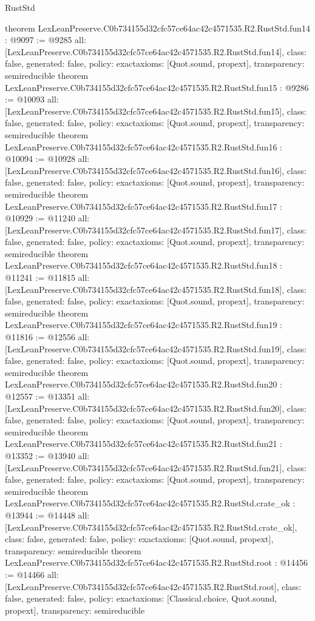 \begin{lexlean}{RustStd}
\begin{coremodule}
{}
theorem LexLeanPreserve.C0b734155d32cfc57ce64ac42c4571535.R2.RustStd.fun14 : @9097 := @9285 {
  all: [LexLeanPreserve.C0b734155d32cfc57ce64ac42c4571535.R2.RustStd.fun14],
  class: false,
  generated: false,
  policy: exact{axioms: [Quot.sound, propext]},
  transparency: semireducible
}
theorem LexLeanPreserve.C0b734155d32cfc57ce64ac42c4571535.R2.RustStd.fun15 : @9286 := @10093 {
  all: [LexLeanPreserve.C0b734155d32cfc57ce64ac42c4571535.R2.RustStd.fun15],
  class: false,
  generated: false,
  policy: exact{axioms: [Quot.sound, propext]},
  transparency: semireducible
}
theorem LexLeanPreserve.C0b734155d32cfc57ce64ac42c4571535.R2.RustStd.fun16 : @10094 := @10928 {
  all: [LexLeanPreserve.C0b734155d32cfc57ce64ac42c4571535.R2.RustStd.fun16],
  class: false,
  generated: false,
  policy: exact{axioms: [Quot.sound, propext]},
  transparency: semireducible
}
theorem LexLeanPreserve.C0b734155d32cfc57ce64ac42c4571535.R2.RustStd.fun17 : @10929 := @11240 {
  all: [LexLeanPreserve.C0b734155d32cfc57ce64ac42c4571535.R2.RustStd.fun17],
  class: false,
  generated: false,
  policy: exact{axioms: [Quot.sound, propext]},
  transparency: semireducible
}
theorem LexLeanPreserve.C0b734155d32cfc57ce64ac42c4571535.R2.RustStd.fun18 : @11241 := @11815 {
  all: [LexLeanPreserve.C0b734155d32cfc57ce64ac42c4571535.R2.RustStd.fun18],
  class: false,
  generated: false,
  policy: exact{axioms: [Quot.sound, propext]},
  transparency: semireducible
}
theorem LexLeanPreserve.C0b734155d32cfc57ce64ac42c4571535.R2.RustStd.fun19 : @11816 := @12556 {
  all: [LexLeanPreserve.C0b734155d32cfc57ce64ac42c4571535.R2.RustStd.fun19],
  class: false,
  generated: false,
  policy: exact{axioms: [Quot.sound, propext]},
  transparency: semireducible
}
theorem LexLeanPreserve.C0b734155d32cfc57ce64ac42c4571535.R2.RustStd.fun20 : @12557 := @13351 {
  all: [LexLeanPreserve.C0b734155d32cfc57ce64ac42c4571535.R2.RustStd.fun20],
  class: false,
  generated: false,
  policy: exact{axioms: [Quot.sound, propext]},
  transparency: semireducible
}
theorem LexLeanPreserve.C0b734155d32cfc57ce64ac42c4571535.R2.RustStd.fun21 : @13352 := @13940 {
  all: [LexLeanPreserve.C0b734155d32cfc57ce64ac42c4571535.R2.RustStd.fun21],
  class: false,
  generated: false,
  policy: exact{axioms: [Quot.sound, propext]},
  transparency: semireducible
}
theorem LexLeanPreserve.C0b734155d32cfc57ce64ac42c4571535.R2.RustStd.crate_ok : @13944 := @14448 {
  all: [LexLeanPreserve.C0b734155d32cfc57ce64ac42c4571535.R2.RustStd.crate_ok],
  class: false,
  generated: false,
  policy: exact{axioms: [Quot.sound, propext]},
  transparency: semireducible
}
theorem LexLeanPreserve.C0b734155d32cfc57ce64ac42c4571535.R2.RustStd.root : @14456 := @14466 {
  all: [LexLeanPreserve.C0b734155d32cfc57ce64ac42c4571535.R2.RustStd.root],
  class: false,
  generated: false,
  policy: exact{axioms: [Classical.choice, Quot.sound, propext]},
  transparency: semireducible
}


\end{coremodule}
\end{lexlean}
